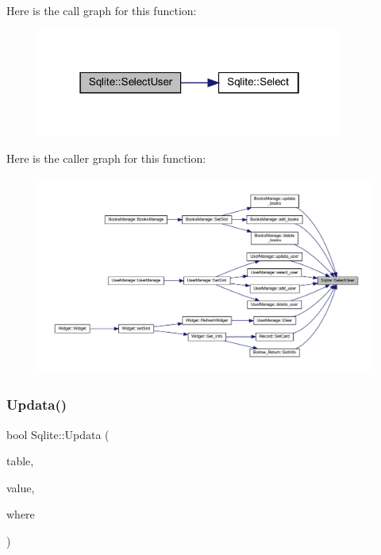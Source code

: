 Here is the call graph for this function\+:
\nopagebreak
\begin{figure}[H]
\begin{center}
\leavevmode
\includegraphics[width=286pt]{class_sqlite_a7c9c4f27369ce4566bce56614c3e11f0_cgraph}
\end{center}
\end{figure}
Here is the caller graph for this function\+:
\nopagebreak
\begin{figure}[H]
\begin{center}
\leavevmode
\includegraphics[width=350pt]{class_sqlite_a7c9c4f27369ce4566bce56614c3e11f0_icgraph}
\end{center}
\end{figure}
\mbox{\label{class_sqlite_ae014031d1e0b0d9c412fb72ddc5a0043}} 
\subsubsection{\texorpdfstring{Updata()}{Updata()}}
{\footnotesize\ttfamily bool Sqlite\+::\+Updata (\begin{DoxyParamCaption}\item[{Q\+String}]{table,  }\item[{Q\+String}]{value,  }\item[{Q\+String}]{where }\end{DoxyParamCaption})}

